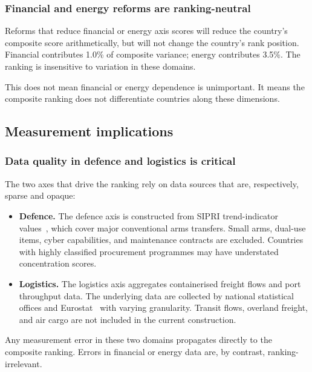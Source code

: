 \subsubsection{Financial and energy reforms are ranking-neutral}

Reforms that reduce financial or energy axis scores will reduce the
country's composite score arithmetically, but will not change the
country's rank position.  Financial contributes 1.0\% of composite
variance; energy contributes 3.5\%.  The ranking is insensitive to
variation in these domains.

This does not mean financial or energy dependence is unimportant.
It means the {\ISI} composite ranking does not differentiate
countries along these dimensions.

\subsection{Measurement implications}

\subsubsection{Data quality in defence and logistics is critical}

The two axes that drive the ranking rely on data sources that are,
respectively, sparse and opaque:

\begin{itemize}[leftmargin=2em]
  \item \textbf{Defence.}  The {\ISI} defence axis is constructed
    from SIPRI trend-indicator values~\cite{sipri_transfers}, which
    cover major conventional arms transfers.  Small arms, dual-use
    items, cyber capabilities, and maintenance contracts are excluded.
    Countries with highly classified procurement programmes may have
    understated concentration scores.

  \item \textbf{Logistics.}  The logistics axis aggregates
    containerised freight flows and port throughput data.  The
    underlying data are collected by national statistical offices and
    Eurostat~\cite{eurostat_comext} with varying granularity.  Transit
    flows, overland freight, and air cargo are not included in the
    current construction.
\end{itemize}

\noindent
Any measurement error in these two domains propagates directly to
the composite ranking.  Errors in financial or energy data are,
by contrast, ranking-irrelevant.

